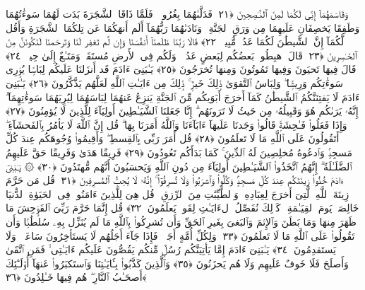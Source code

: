  وَقَاسَمَهُمَآ إِنِّى لَكُمَا لَمِنَ ٱلنَّـٰصِحِينَ ﴿٢١﴾
 فَدَلَّىٰهُمَا بِغُرُورٍۢ ۚ فَلَمَّا ذَاقَا ٱلشَّجَرَةَ بَدَت لَهُمَا سَوءَٰتُهُمَا وَطَفِقَا يَخصِفَانِ عَلَيهِمَا مِن وَرَقِ ٱلجَنَّةِ ۖ وَنَادَىٰهُمَا رَبُّهُمَآ أَلَم أَنهَكُمَا عَن تِلكُمَا ٱلشَّجَرَةِ وَأَقُل لَّكُمَآ إِنَّ ٱلشَّيطَٰنَ لَكُمَا عَدُوٌّۭ مُّبِينٌۭ ﴿٢٢﴾
 قَالَا رَبَّنَا ظَلَمنَآ أَنفُسَنَا وَإِن لَّم تَغفِر لَنَا وَتَرحَمنَا لَنَكُونَنَّ مِنَ ٱلخَـٰسِرِينَ ﴿٢٣﴾
 قَالَ ٱهبِطُوا۟ بَعضُكُم لِبَعضٍ عَدُوٌّۭ ۖ وَلَكُم فِى ٱلأَرضِ مُستَقَرٌّۭ وَمَتَـٰعٌ إِلَىٰ حِينٍۢ ﴿٢٤﴾
 قَالَ فِيهَا تَحيَونَ وَفِيهَا تَمُوتُونَ وَمِنهَا تُخرَجُونَ ﴿٢٥﴾
 يَـٰبَنِىٓ ءَادَمَ قَد أَنزَلنَا عَلَيكُم لِبَاسًۭا يُوَٟرِى سَوءَٰتِكُم وَرِيشًۭا ۖ وَلِبَاسُ ٱلتَّقوَىٰ ذَٟلِكَ خَيرٌۭ ۚ ذَٟلِكَ مِن ءَايَـٰتِ ٱللَّهِ لَعَلَّهُم يَذَّكَّرُونَ ﴿٢٦﴾
 يَـٰبَنِىٓ ءَادَمَ لَا يَفتِنَنَّكُمُ ٱلشَّيطَٰنُ كَمَآ أَخرَجَ أَبَوَيكُم مِّنَ ٱلجَنَّةِ يَنزِعُ عَنهُمَا لِبَاسَهُمَا لِيُرِيَهُمَا سَوءَٰتِهِمَآ ۗ إِنَّهُۥ يَرَىٰكُم هُوَ وَقَبِيلُهُۥ مِن حَيثُ لَا تَرَونَهُم ۗ إِنَّا جَعَلنَا ٱلشَّيَـٰطِينَ أَولِيَآءَ لِلَّذِينَ لَا يُؤمِنُونَ ﴿٢٧﴾
 وَإِذَا فَعَلُوا۟ فَـٰحِشَةًۭ قَالُوا۟ وَجَدنَا عَلَيهَآ ءَابَآءَنَا وَٱللَّهُ أَمَرَنَا بِهَا ۗ قُل إِنَّ ٱللَّهَ لَا يَأمُرُ بِٱلفَحشَآءِ ۖ أَتَقُولُونَ عَلَى ٱللَّهِ مَا لَا تَعلَمُونَ ﴿٢٨﴾
 قُل أَمَرَ رَبِّى بِٱلقِسطِ ۖ وَأَقِيمُوا۟ وُجُوهَكُم عِندَ كُلِّ مَسجِدٍۢ وَٱدعُوهُ مُخلِصِينَ لَهُ ٱلدِّينَ ۚ كَمَا بَدَأَكُم تَعُودُونَ ﴿٢٩﴾
 فَرِيقًا هَدَىٰ وَفَرِيقًا حَقَّ عَلَيهِمُ ٱلضَّلَـٰلَةُ ۗ إِنَّهُمُ ٱتَّخَذُوا۟ ٱلشَّيَـٰطِينَ أَولِيَآءَ مِن دُونِ ٱللَّهِ وَيَحسَبُونَ أَنَّهُم مُّهتَدُونَ ﴿٣٠﴾
 ۞ يَـٰبَنِىٓ ءَادَمَ خُذُوا۟ زِينَتَكُم عِندَ كُلِّ مَسجِدٍۢ وَكُلُوا۟ وَٱشرَبُوا۟ وَلَا تُسرِفُوٓا۟ ۚ إِنَّهُۥ لَا يُحِبُّ ٱلمُسرِفِينَ ﴿٣١﴾
 قُل مَن حَرَّمَ زِينَةَ ٱللَّهِ ٱلَّتِىٓ أَخرَجَ لِعِبَادِهِۦ وَٱلطَّيِّبَٰتِ مِنَ ٱلرِّزقِ ۚ قُل هِىَ لِلَّذِينَ ءَامَنُوا۟ فِى ٱلحَيَوٰةِ ٱلدُّنيَا خَالِصَةًۭ يَومَ ٱلقِيَـٰمَةِ ۗ كَذَٟلِكَ نُفَصِّلُ ٱلءَايَـٰتِ لِقَومٍۢ يَعلَمُونَ ﴿٣٢﴾
 قُل إِنَّمَا حَرَّمَ رَبِّىَ ٱلفَوَٟحِشَ مَا ظَهَرَ مِنهَا وَمَا بَطَنَ وَٱلإِثمَ وَٱلبَغىَ بِغَيرِ ٱلحَقِّ وَأَن تُشرِكُوا۟ بِٱللَّهِ مَا لَم يُنَزِّل بِهِۦ سُلطَٰنًۭا وَأَن تَقُولُوا۟ عَلَى ٱللَّهِ مَا لَا تَعلَمُونَ ﴿٣٣﴾
 وَلِكُلِّ أُمَّةٍ أَجَلٌۭ ۖ فَإِذَا جَآءَ أَجَلُهُم لَا يَستَأخِرُونَ سَاعَةًۭ ۖ وَلَا يَستَقدِمُونَ ﴿٣٤﴾
 يَـٰبَنِىٓ ءَادَمَ إِمَّا يَأتِيَنَّكُم رُسُلٌۭ مِّنكُم يَقُصُّونَ عَلَيكُم ءَايَـٰتِى ۙ فَمَنِ ٱتَّقَىٰ وَأَصلَحَ فَلَا خَوفٌ عَلَيهِم وَلَا هُم يَحزَنُونَ ﴿٣٥﴾
 وَٱلَّذِينَ كَذَّبُوا۟ بِـَٔايَـٰتِنَا وَٱستَكبَرُوا۟ عَنهَآ أُو۟لَـٰٓئِكَ أَصحَـٰبُ ٱلنَّارِ ۖ هُم فِيهَا خَـٰلِدُونَ ﴿٣٦﴾
